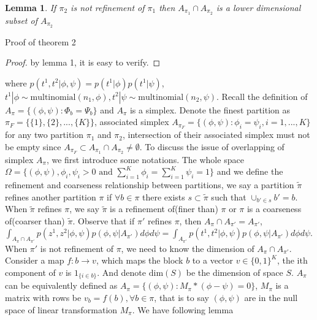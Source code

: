 \documentclass[11pt]{amsart}
\newtheorem{lemma}{Lemma}
\begin{document}
\section{}
\hfill\\
\begin{lemma}
If $\pi_2$ is not refinement of $\pi_1$ then $A_{\pi_1} \cap A_{\pi_2}$ is a lower dimensional subset of $A_{\pi_2}$
\end{lemma}
Proof of theorem 2
\begin{proof}
by lemma 1, it is easy to verify.
\end{proof}
where $p(t^1,t^2|\phi,\psi) = p(t^1|\phi)p(t^1|\psi)$, $t^1|\phi \sim \text{multinomial}(n_1, \phi), t^2|\psi \sim \text{multinomial}(n_2, \psi)$. Recall the definition of $A_\pi = \{(\phi,\psi): \Phi_b = \Psi_b\}$ and $A_\pi$ is a simplex. Denote the finest partition as $\pi_{F} = \{ \{1\}, \{2\},...,\{K\}\}$, associated simplex $A_{\pi_{F}} = \{(\phi, \psi): \phi_i = \psi_i, i = 1,...,K\}$ for any two partition $\pi_1$ and $\pi_2$, intersection of their associated simplex must not be empty since $A_{\pi_{F}}\subset A_{\pi_1}\cap A_{\pi_2} \neq \emptyset$.  To discuss the issue of overlapping of simplex $A_\pi$, we first introduce some notations. The whole space $\Omega = \{ (\phi,\psi), \phi_i,\psi_i > 0 \text{ and } \sum_{i=1}^K \phi_i = \sum_{i=1}^K \psi_i = 1\}$ and we define the refinement and coarseness relationship between partitions, we say a partition $\tilde{\pi}$ refines another partition $\pi$ if $\forall b \in \pi$ there exists $s \subset \tilde{\pi}$  such that $\cup_{b'\in s} b' = b$. When $\tilde{\pi}$ refines $\pi$, we say $\tilde{\pi}$ is a refinement of(finer than) $\pi$ or $\pi$ is a coarseness of(coarser than) $\tilde{\pi}$. 
Observe that if $\pi'$ refines $\pi$, then $A_\pi \cap A_{\pi'} = A_{\pi'}$, $\int_{A_\pi\cap A_{\pi'}} p(z^1,z^2|\phi,\psi)p(\phi, \psi | A_{\pi'})d\phi d\psi = \int_{A_{\pi'}} p(t^1,t^2|\phi,\psi)p(\phi, \psi | A_{\pi'})d\phi d\psi $. When $\pi'$ is not refinement of $\pi$, we need to know the dimension of $A_\pi\cap A_{\pi'}$. Consider a map $f: b \rightarrow v$, which maps the block $b$ to a vector $v\in \{0, 1\}^K$, the ith component of $v$ is $1_{\{i\in b\}}$. And denote $\text{dim}(S)$ be the dimension of space $S$. $A_\pi$ can be equivalently defined as $A_\pi =  \{(\phi,\psi): M_\pi * (\phi - \psi) = 0\}$, $M_\pi$ is a matrix with rows be $v_b = f(b), \forall b\in \pi$, that is to say $(\phi,\psi)$ are in the null space of linear transformation $M_\pi$.  We have following lemma\\
\end{document}

